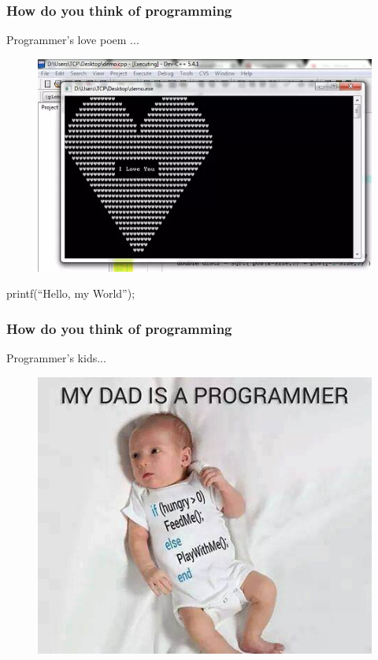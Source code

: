 \documentclass{beamer}
\newcommand{\quotes}[1]{``#1''}
\begin{document}
\begin{frame}
  \frametitle{How do you think of programming}
  \huge{Programmer's love poem ...}
  \begin{center}
    \begin{figure}
      \includegraphics[scale=.3]{./img/cool_love1.png}
    \end{figure}
  \end{center}

  \huge printf(\quotes{Hello, my World});
\end{frame}


\begin{frame}
  \frametitle{How do you think of programming}
  \huge{Programmer's kids...}
  \begin{center}
    \begin{figure}
      \includegraphics[scale=.4]{./img/programmer_son.jpeg}
    \end{figure}
  \end{center}

\end{frame}
\end{document}
